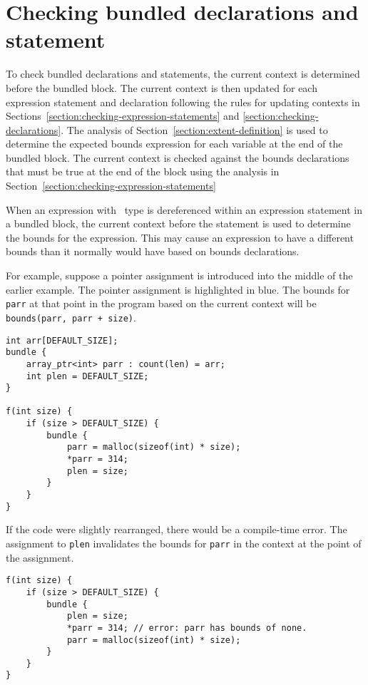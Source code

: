 \section{Checking bundled declarations and statement}
\label{section:checking-bundled}

To check bundled declarations and statements, the current context is
determined before the bundled block. The current context is then updated
for each expression statement and declaration following the rules for
updating contexts in Sections~\ref{section:checking-expression-statements} and 
\ref{section:checking-declarations}. The analysis of 
Section~\ref{section:extent-definition}
is used to determine the expected bounds expression for each variable at
the end of the bundled block. The current context is checked against the
bounds declarations that must be true at the end of the block using the
analysis in Section~\ref{section:checking-expression-statements}

When an expression with \arrayptr\ type is dereferenced within
an expression statement in a bundled block, the current context before
the statement is used to determine the bounds for the expression. This
may cause an expression to have a different bounds than it normally
would have based on bounds declarations.

For example, suppose a pointer assignment is introduced into the middle
of the earlier example. The pointer assignment is highlighted in blue.
The bounds for \verb|parr| at that point in the program based on the
current context will be \verb|bounds(parr, parr + size)|.
\begin{verbatim}
int arr[DEFAULT_SIZE];
bundle {
    array_ptr<int> parr : count(len) = arr;
    int plen = DEFAULT_SIZE;
}

f(int size) {
    if (size > DEFAULT_SIZE) {
        bundle {
            parr = malloc(sizeof(int) * size);
            *parr = 314;
            plen = size;
        }
    }
}
\end{verbatim}

If the code were slightly rearranged, there would be a compile-time
error. The assignment to \texttt{plen} invalidates the bounds for
\texttt{parr} in the context at the point of the assignment.
\begin{verbatim}
f(int size) {
    if (size > DEFAULT_SIZE) {
        bundle {
            plen = size;
            *parr = 314; // error: parr has bounds of none.
            parr = malloc(sizeof(int) * size);
        }
    }
}
\end{verbatim}

